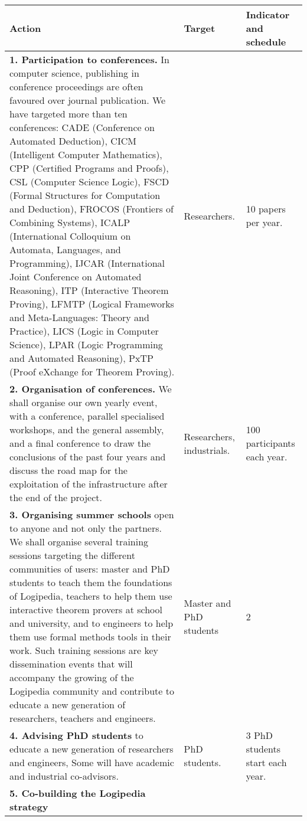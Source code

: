 \begin{longtable*}{|p{0.55\textwidth}|p{0.12\textwidth}|p{0.15\textwidth}|}
\hline
{\bf Action}
&
{\bf Target}
&
{\bf Indicator and schedule}
\\
\hline
{\bf 1. Participation to conferences.}
In computer science, publishing in conference
proceedings are often favoured over journal publication. We have targeted
more than ten conferences:
CADE (Conference on Automated Deduction),
CICM (Intelligent Computer Mathematics),
CPP (Certified Programs and Proofs),
CSL (Computer Science Logic),
FSCD (Formal Structures for Computation and Deduction),
FROCOS (Frontiers of Combining Systems),
ICALP (International Colloquium on Automata, Languages, and Programming),
IJCAR (International Joint Conference on Automated Reasoning),
ITP (Interactive Theorem Proving),
LFMTP (Logical Frameworks and Meta-Languages: Theory
and Practice), 
LICS (Logic in Computer Science),
LPAR (Logic Programming and Automated Reasoning),
PxTP (Proof eXchange for Theorem Proving).
&
Researchers.
&
10 papers per year.
\\
\hline
{\bf 2. Organisation of conferences.}
We shall organise our own yearly event, with a conference, parallel
specialised workshops, and the general assembly, and a final
conference to draw the conclusions of the past four years and discuss the
road map for the exploitation of the infrastructure after the end of the
project.
&
Researchers, industrials.
&
100 participants each year.
\\
\hline
{\bf 3. Organising summer schools}
open to anyone and not only the partners.
We shall organise several training sessions targeting the
different communities of users: master and PhD students to teach them
the foundations of Logipedia, teachers to help them use interactive
theorem provers at school and university, and to engineers to help
them use formal methods tools in their work. Such training sessions
are key dissemination events that will accompany the growing of the
Logipedia community and contribute to educate a new generation of researchers,
teachers and engineers.
&
Master and PhD students
&
2
\\
\hline
    {\bf 4.
Advising PhD students} 
to educate a new generation of researchers and engineers, 
Some will have academic and industrial co-advisors.
&
PhD students.
&
3 PhD students start each year.
\\
\hline
{\bf 5. Co-building the Logipedia strategy}

\end{longtable*}
